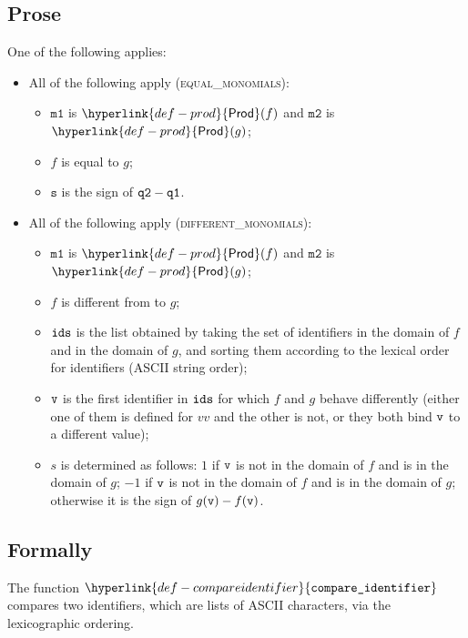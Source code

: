 \documentclass{book}
\newcommand\compareidentifier[0]{\hyperlink{def-compareidentifier}{\texttt{compare\_identifier}}}
\newcommand\Prod[0]{\hyperlink{def-prod}{\textsf{Prod}}}
\newcommand\vmone[0]{\texttt{m1}}
\newcommand\vmtwo[0]{\texttt{m2}}
\newcommand\vs[0]{\texttt{s}}
\begin{document}
\subsection{Prose}
One of the following applies:
\begin{itemize}
  \item All of the following apply (\textsc{equal\_monomials}):
  \begin{itemize}
    \item $\vmone$ is $\Prod(f)$ and $\vmtwo$ is $\Prod(g)$;
    \item $f$ is equal to $g$;
    \item $\vs$ is the sign of $\texttt{q2} - \texttt{q1}$.
  \end{itemize}

  \item All of the following apply (\textsc{different\_monomials}):
  \begin{itemize}
    \item $\vmone$ is $\Prod(f)$ and $\vmtwo$ is $\Prod(g)$;
    \item $f$ is different from to $g$;
    \item $\texttt{ids}$ is the list obtained by taking the set of identifiers in the domain of $f$ and in the domain of $g$,
          and sorting them according to the lexical order for identifiers (ASCII string order);
    \item $\texttt{v}$ is the first identifier in $\texttt{ids}$ for which $f$ and $g$ behave differently (either one of them is defined
          for $vv$ and the other is not, or they both bind $\texttt{v}$ to a different value);
    \item $s$ is determined as follows: $1$ if $\texttt{v}$ is not in the domain of $f$ and is in the domain of $g$;
          $-1$ if $\texttt{v}$ is not in the domain of $f$ and is in the domain of $g$;
          otherwise it is the sign of $g(\texttt{v})-f(\texttt{v})$.
  \end{itemize}
\end{itemize}

\subsection{Formally}
\hypertarget{def-compareidentifier}{}
The function $\compareidentifier$ compares two identifiers, which are lists of ASCII characters,
via the lexicographic ordering.
\end{document}
